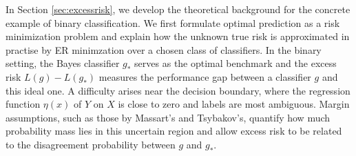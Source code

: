In Section \ref{sec:excessrisk}, we develop the theoretical background for the concrete example of binary classification. We first formulate optimal prediction as a risk minimization problem and explain how the unknown true risk is approximated in practise by ER minimzation over a chosen class of classifiers. In the binary setting, the Bayes classifier $g_*$ serves as the optimal benchmark and the excess risk $L(g)-L(g_*)$ measures the performance gap between a classifier $g$ and this ideal one. A difficulty arises near the decision boundary, where the regression function $\eta(x)$ of $Y$ on $X$ is close to zero and labels are most ambiguous. Margin assumptions, such as those by Massart's and Tsybakov's, quantify how much probability mass lies in this uncertain region and allow excess risk to be related to the disagreement probability between $g$ and $g_*$.












